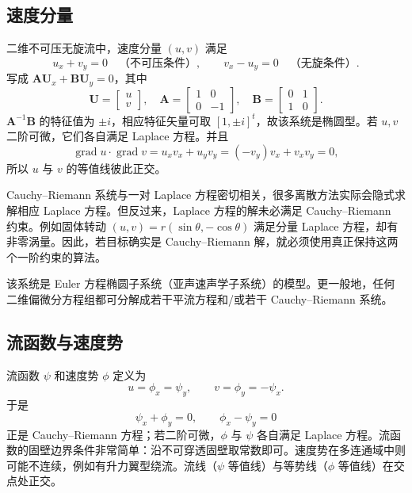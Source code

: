 \documentclass[11pt,a4paper,openany,fontset=none]{ctexbook}
\begin{document}
\subsection{速度分量}

二维不可压无旋流中，速度分量 $(u,v)$ 满足
\begin{equation}
 u_x+v_y=0\quad\text{（不可压条件）},\qquad
 v_x-u_y=0\quad\text{（无旋条件）}. \tag{2.9.1--2}
\end{equation}
写成 $\bm A\bm U_x+\bm B\bm U_y=0$，其中
\begin{equation}
 \bm U=\begin{bmatrix}u\\v\end{bmatrix},\quad
 \bm A=\begin{bmatrix}1&0\\0&-1\end{bmatrix},\quad
 \bm B=\begin{bmatrix}0&1\\1&0\end{bmatrix}. \tag{2.9.4}
\end{equation}
$\bm A^{-1}\bm B$ 的特征值为 $\pm i$，相应特征矢量可取 $[1,\pm i]^t$，故该系统是椭圆型。若 $u,v$ 二阶可微，它们各自满足 Laplace 方程。并且
\begin{equation}
 \operatorname{grad}u\cdot\operatorname{grad}v=u_xv_x+u_yv_y=(-v_y)v_x+v_xv_y=0, \tag{2.9.8}
\end{equation}
所以 $u$ 与 $v$ 的等值线彼此正交。

Cauchy--Riemann 系统与一对 Laplace 方程密切相关，很多离散方法实际会隐式求解相应 Laplace 方程。但反过来，Laplace 方程的解未必满足 Cauchy--Riemann 约束。例如固体转动 $(u,v)=r(\sin\theta,-\cos\theta)$ 满足分量 Laplace 方程，却有非零涡量。因此，若目标确实是 Cauchy--Riemann 解，就必须使用真正保持这两个一阶约束的算法。

该系统是 Euler 方程椭圆子系统（亚声速声学子系统）的模型。更一般地，任何二维偏微分方程组都可分解成若干平流方程和/或若干 Cauchy--Riemann 系统。

\subsection{流函数与速度势}

流函数 $\psi$ 和速度势 $\phi$ 定义为
\begin{equation}
 u=\phi_x=\psi_y,\qquad v=\phi_y=-\psi_x. \tag{2.9.9--10}
\end{equation}
于是
\begin{equation}
 \psi_x+\phi_y=0,\qquad \phi_x-\psi_y=0 \tag{2.9.11--12}
\end{equation}
正是 Cauchy--Riemann 方程；若二阶可微，$\phi$ 与 $\psi$ 各自满足 Laplace 方程。流函数的固壁边界条件非常简单：沿不可穿透固壁取常数即可。速度势在多连通域中则可能不连续，例如有升力翼型绕流。流线（$\psi$ 等值线）与等势线（$\phi$ 等值线）在交点处正交。
\end{document}
